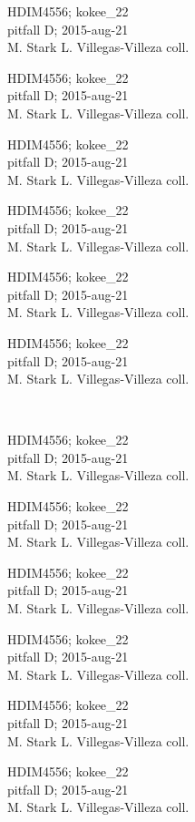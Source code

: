 \documentclass[2pt]{extarticle}
\begin{document}
\noindent
\parbox{0.16\textwidth}{\tiny \raggedright \rule[-0.3\baselineskip]{0pt}{10pt}HDIM4556; kokee\_22\\ pitfall D; 2015-aug-21\\ M. Stark L. Villegas-Villeza coll.}
\parbox{0.16\textwidth}{\tiny \raggedright \rule[-0.3\baselineskip]{0pt}{10pt}HDIM4556; kokee\_22\\ pitfall D; 2015-aug-21\\ M. Stark L. Villegas-Villeza coll.}
\parbox{0.16\textwidth}{\tiny \raggedright \rule[-0.3\baselineskip]{0pt}{10pt}HDIM4556; kokee\_22\\ pitfall D; 2015-aug-21\\ M. Stark L. Villegas-Villeza coll.}
\parbox{0.16\textwidth}{\tiny \raggedright \rule[-0.3\baselineskip]{0pt}{10pt}HDIM4556; kokee\_22\\ pitfall D; 2015-aug-21\\ M. Stark L. Villegas-Villeza coll.}
\parbox{0.16\textwidth}{\tiny \raggedright \rule[-0.3\baselineskip]{0pt}{10pt}HDIM4556; kokee\_22\\ pitfall D; 2015-aug-21\\ M. Stark L. Villegas-Villeza coll.}
\parbox{0.16\textwidth}{\tiny \raggedright \rule[-0.3\baselineskip]{0pt}{10pt}HDIM4556; kokee\_22\\ pitfall D; 2015-aug-21\\ M. Stark L. Villegas-Villeza coll.} \\ 
\vspace{0.001in} 

\noindent
\parbox{0.16\textwidth}{\tiny \raggedright \rule[-0.3\baselineskip]{0pt}{10pt}HDIM4556; kokee\_22\\ pitfall D; 2015-aug-21\\ M. Stark L. Villegas-Villeza coll.}
\parbox{0.16\textwidth}{\tiny \raggedright \rule[-0.3\baselineskip]{0pt}{10pt}HDIM4556; kokee\_22\\ pitfall D; 2015-aug-21\\ M. Stark L. Villegas-Villeza coll.}
\parbox{0.16\textwidth}{\tiny \raggedright \rule[-0.3\baselineskip]{0pt}{10pt}HDIM4556; kokee\_22\\ pitfall D; 2015-aug-21\\ M. Stark L. Villegas-Villeza coll.}
\parbox{0.16\textwidth}{\tiny \raggedright \rule[-0.3\baselineskip]{0pt}{10pt}HDIM4556; kokee\_22\\ pitfall D; 2015-aug-21\\ M. Stark L. Villegas-Villeza coll.}
\parbox{0.16\textwidth}{\tiny \raggedright \rule[-0.3\baselineskip]{0pt}{10pt}HDIM4556; kokee\_22\\ pitfall D; 2015-aug-21\\ M. Stark L. Villegas-Villeza coll.}
\parbox{0.16\textwidth}{\tiny \raggedright \rule[-0.3\baselineskip]{0pt}{10pt}HDIM4556; kokee\_22\\ pitfall D; 2015-aug-21\\ M. Stark L. Villegas-Villeza coll.} \\ 
\vspace{0.001in} 
\end{document}
